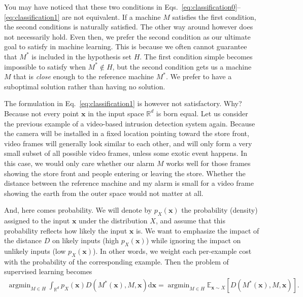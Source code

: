 \documentclass{report}
\newcommand{\vect}[1]{\mathbf{#1}}
\newcommand{\vx}[0]{\vect{x}}
\DeclareMathOperator*{\argmin}{\arg \min}
\begin{document}
You may have noticed that these two conditions in
Eqs.~\eqref{eq:classification0}--\eqref{eq:classification1} are not equivalent.
If a machine $M$ satisfies the first condition, the second conditions is
naturally satisfied. The other way around however does not necessarily hold.
Even then, we prefer the second condition as our ultimate goal to satisfy in
machine learning. This is because we often cannot guarantee that $M^*$ is
included in the hypothesis set $H$. The first condition simple becomes
impossible to satisfy when $M^* \notin H$, but the second condition gets us a
machine $M$ that is {\it close} enough to the reference machine $M^*$. We prefer
to have a suboptimal solution rather than having no solution.

The formulation in Eq.~\eqref{eq:classification1} is however not satisfactory.
Why? Because not every point $\vx$ in the input space $\mathbb{R}^d$ is born
equal. Let us consider the previous example of a video-based intrusion detection
system again. Because the camera will be installed in a fixed location pointing toward
the store front, video frames will generally look similar to each other, and
will only form a very small subset of all possible video frames, unless some
exotic event happens. In this case, we would only care whether our alarm $M$
works well for those frames showing the store front and people entering or
leaving the store. Whether the distance between the reference machine and my
alarm is small for a video frame showing the earth from the outer space would
not matter at all.

And, here comes probability. We will denote by $p_X(\vx)$ the probability
(density) assigned to the input $\vx$ under the distribution $X$, and assume
that this probability reflects how likely the input $\vx$ is. We want to
emphasize the impact of the distance $D$ on likely inputs (high $p_X(\vx)$)
while ignoring the impact on unlikely inputs (low $p_X(\vx)$). In other words,
we weight each per-example cost with the probability of the corresponding
example. Then the problem of supervised learning becomes 
\begin{align}
    \label{eq:expected_loss0}
    \argmin_{M\in H} \int_{\mathbb{R}^d} p_X(\vx) D(M^*(\vx), M, \vx) \text{d}\vx 
    = \argmin_{M \in H} \mathbb{E}_{\vx \sim X} \left[ D(M^*(\vx),  M, \vx)
    \right].
\end{align}
\end{document}
